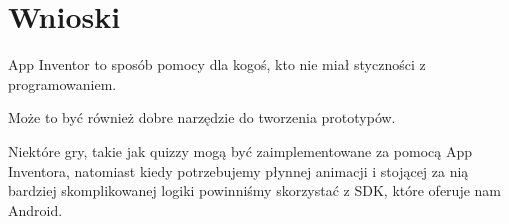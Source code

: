 \chapter{Wnioski}

App Inventor to sposób pomocy dla kogoś, kto nie miał styczności z programowaniem. 

Może to być również dobre narzędzie do tworzenia prototypów.

Niektóre gry, takie jak quizzy mogą być zaimplementowane za pomocą App Inventora, natomiast kiedy potrzebujemy płynnej animacji i stojącej za nią bardziej skomplikowanej logiki powinniśmy skorzystać z SDK, które oferuje nam Android.